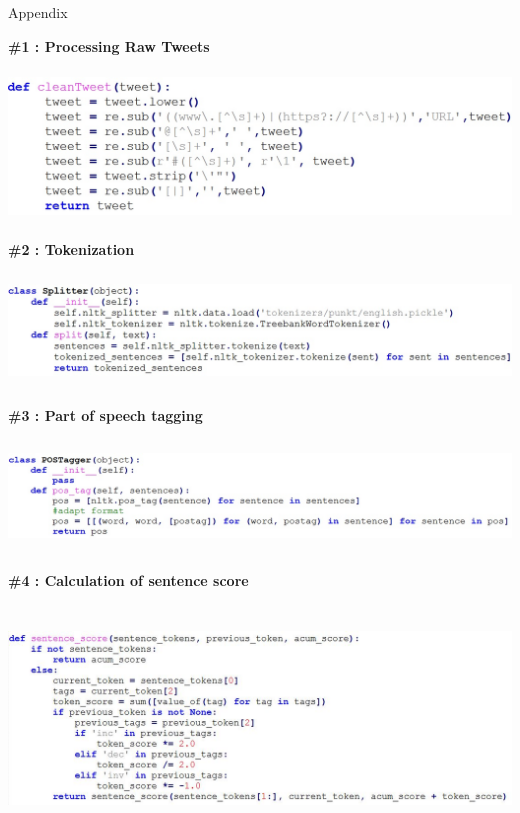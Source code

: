 \documentclass[a4paper,12pt]{report}
\begin{document}
\newpage
\pagestyle{empty}
\begin{appendices}
\begin{center}
\begin{bf}
\Huge{Appendix}
\end{bf}
\end{center}
\textbf{\large \#1 : Processing Raw Tweets }
\begin{center}
	\includegraphics[height=4cm]{images/CleannigTweet_module.jpg}
\end{center}
\textbf{\large \#2 : Tokenization }
\begin{center}
	\includegraphics[height=3cm]{images/SplitterModule.jpg}
\end{center}
\textbf{\large \#3 : Part of speech tagging }
\begin{center}
	\includegraphics[height=3cm]{images/PostTaggingModule.jpg}
\end{center}
\textbf{\large \#4 : Calculation of sentence score }
\begin{center}
	\includegraphics[height=6cm]{images/SentenceScoreModule.jpg}

\end{center}
\end{appendices}
\end{document}
